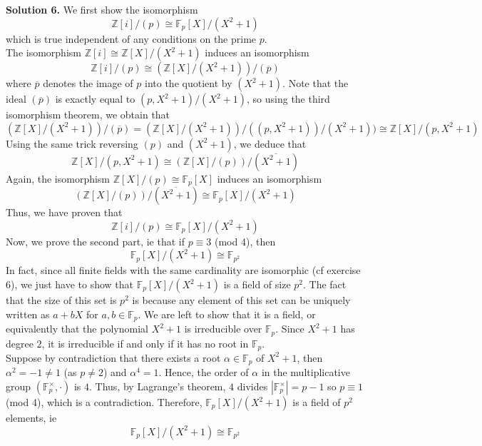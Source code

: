 \documentclass[12pt,a4paper]{article}
\begin{document}
	\textbf{Solution 6.} We first show the isomorphism \[ \mathbb{Z}[i]/(p) \cong \mathbb{F}_p[X]/(X^2 + 1) \] which is true independent of any conditions on the prime $p$. \\
	The isomorphism  $\mathbb{Z}[i] \cong \mathbb{Z}[X]/(X^2 + 1)$ induces an isomorphism \[ \mathbb{Z}[i]/(p) \cong (\mathbb{Z}[X]/(X^2 + 1))/(\overline{p}) \] where $\overline{p}$ denotes the image of $p$ into the quotient by $(X^2 + 1)$. Note that the ideal $(\overline{p})$ is exactly equal to $(p, X^2 + 1)/(X^2 + 1)$, so using the third isomorphism theorem, we obtain that \[ (\mathbb{Z}[X]/(X^2 + 1))/(\overline{p}) = (\mathbb{Z}[X]/(X^2 + 1))/((p, X^2 + 1))/(X^2 + 1)) \cong \mathbb{Z}[X]/(p, X^2 + 1) \] Using the same trick reversing $(p)$ and $(X^2 + 1)$, we deduce that \[ \mathbb{Z}[X]/(p, X^2 + 1) \cong (\mathbb{Z}[X]/(p))/(\overline{X^2 + 1}) \] Again, the isomorphism $\mathbb{Z}[X]/(p) \cong \mathbb{F}_p[X]$ induces an isomorphism \[ (\mathbb{Z}[X]/(p))/(\overline{X^2 + 1}) \cong \mathbb{F}_p[X]/(X^2 + 1) \] Thus, we have proven that \[ \mathbb{Z}[i]/(p) \cong \mathbb{F}_p[X]/(X^2 + 1) \]
	Now, we prove the second part, ie that if $p \equiv 3$ (mod 4), then \[ \mathbb{F}_p[X]/(X^2 + 1) \cong \mathbb{F}_{p^2} \]
	In fact, since all finite fields with the same cardinality are isomorphic (cf exercise $6$), we just have to show that $\mathbb{F}_p[X]/(X^2 + 1)$ is a field of size $p^2$.
	The fact that the size of this set is $p^2$ is because any element of this set can be uniquely written as $a + bX$ for $a, b \in \mathbb{F}_p$. We are left to show that it is a field, or equivalently that the polynomial $X^2 + 1$ is irreducible over $\mathbb{F}_p$. Since $X^2 + 1$ has degree $2$, it is irreducible if and only if it has no root in $\mathbb{F}_p$. \\
	Suppose by contradiction that there exists a root $\alpha \in \mathbb{F}_p$ of $X^2 + 1$, then $\alpha^2 = -1 \neq 1$ (as $p \neq 2$) and $\alpha^4 = 1$. Hence, the order of $\alpha$ in the multiplicative group $(\mathbb{F}_p^\times, \cdot)$ is $4$. Thus, by Lagrange's theorem, $4$ divides $|\mathbb{F}_p^\times|= p - 1$ so $p \equiv 1$ (mod 4), which is a contradiction. Therefore, $\mathbb{F}_p[X]/(X^2 + 1)$ is a field of $p^2$ elements, ie 
	\[ \mathbb{F}_p[X]/(X^2 + 1) \cong \mathbb{F}_{p^2} \]
	
\end{document}
